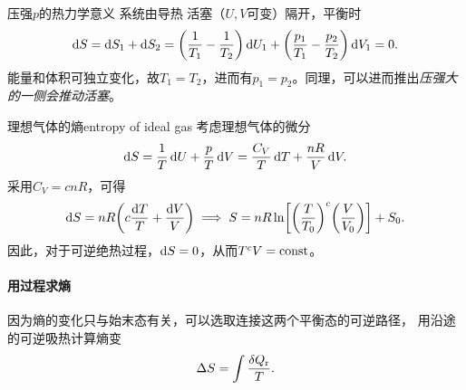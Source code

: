 \begin{example}
	{压强$p$的热力学意义}{}
	系统由导热
	活塞（$U,V$可变）隔开，平衡时
	\[
		\mathop{}\!\mathrm{d} S = \mathop{}\!\mathrm{d} S_1 + \mathop{}\!\mathrm{d} S_2 = \biggl(\frac1{T_1} - \frac1{T_2}\biggr)\mathop{}\!\mathrm{d} U_1 + \biggl(\frac{p_1}{T_1} - \frac{p_2}{T_2}\biggr)\mathop{}\!\mathrm{d} V_1 = 0.
	\]
	能量和体积可独立变化，故$T_1 = T_2$，进而有$p_1 = p_2$。同理，可以进而推出\textit{压强大的一侧会推动活塞}。
\end{example}

\begin{example}
	{理想气体的熵}{entropy of ideal gas}
	考虑理想气体的微分
	\[
		\mathop{}\!\mathrm{d} S = \frac1T\mathop{}\!\mathrm{d} U + \frac pT\mathop{}\!\mathrm{d} V = \frac{C_V}T\mathop{}\!\mathrm{d} T + \frac{nR}V\mathop{}\!\mathrm{d} V.
	\]
	采用$C_V = cnR$，可得
	\begin{equation}
		\label{eq:sm-ideal-gas-entropy}
		\mathop{}\!\mathrm{d} S = nR\biggl(c\frac{\mathop{}\!\mathrm{d} T}T + \frac{\mathop{}\!\mathrm{d} V}V\biggr) \implies S = nR\ln\biggl[\biggl(\frac{T}{T_0}\biggr)^c\biggl(\frac{V}{V_0}\biggr)\biggr] + S_0.
	\end{equation}
	因此，对于可逆绝热过程，$\mathop{}\!\mathrm{d} S = 0$，从而$T^cV = \mathrm{const}$。
\end{example}

\paragraph{用过程求熵}

因为熵的变化只与始末态有关，可以选取连接这两个平衡态的可逆路径，%
用沿途的可逆吸热计算熵变
\begin{equation}
	\label{eq:sm-reversible-entropy-change}
	\Delta S = \int\frac{\mathop{}\!\delta Q_\mathrm r}{T}.
\end{equation}

